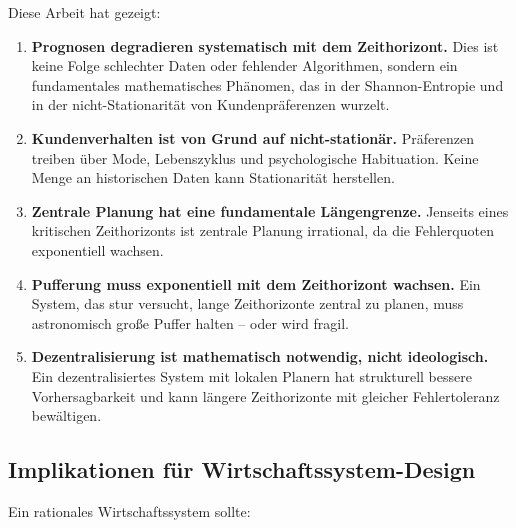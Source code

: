 \documentclass[a4paper, 12pt, twoside, openright]{report}
\theoremstyle{definition}
\theoremstyle{definition}
\begin{document}
Diese Arbeit hat gezeigt:

\begin{enumerate}
  \item \textbf{Prognosen degradieren systematisch mit dem Zeithorizont.} Dies ist keine Folge schlechter Daten oder fehlender Algorithmen, sondern ein fundamentales mathematisches Phänomen, das in der Shannon-Entropie und in der nicht-Stationarität von Kundenpräferenzen wurzelt.
  
  \item \textbf{Kundenverhalten ist von Grund auf nicht-stationär.} Präferenzen treiben über Mode, Lebenszyklus und psychologische Habituation. Keine Menge an historischen Daten kann Stationarität herstellen.
  
  \item \textbf{Zentrale Planung hat eine fundamentale Längengrenze.} Jenseits eines kritischen Zeithorizonts ist zentrale Planung irrational, da die Fehlerquoten exponentiell wachsen.
  
  \item \textbf{Pufferung muss exponentiell mit dem Zeithorizont wachsen.} Ein System, das stur versucht, lange Zeithorizonte zentral zu planen, muss astronomisch große Puffer halten – oder wird fragil.
  
  \item \textbf{Dezentralisierung ist mathematisch notwendig, nicht ideologisch.} Ein dezentralisiertes System mit lokalen Planern hat strukturell bessere Vorhersagbarkeit und kann längere Zeithorizonte mit gleicher Fehlertoleranz bewältigen.
\end{enumerate}

\subsection{Implikationen für Wirtschaftssystem-Design}

Ein rationales Wirtschaftssystem sollte:
\end{document}
